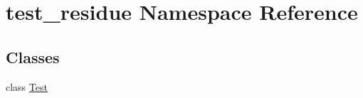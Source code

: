 \hypertarget{namespacetest__residue}{\section{test\-\_\-residue Namespace Reference}
\label{namespacetest__residue}
}
\subsection*{Classes}
\begin{DoxyCompactItemize}
\item 
class \hyperlink{classtest__residue_1_1_test}{Test}
\end{DoxyCompactItemize}
